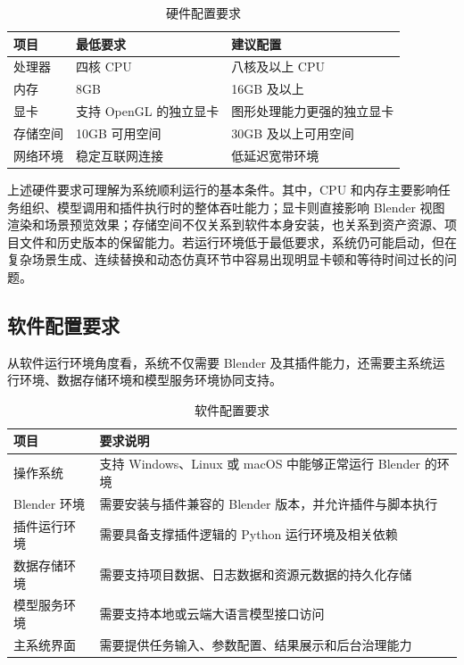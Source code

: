 \documentclass[UTF8,a4paper,10pt]{ctexart}
\begin{document}
\begin{table}[H]
\centering
\caption{硬件配置要求}
\begin{tabularx}{\textwidth}{p{3.0cm} Y Y}
\toprule
项目 & 最低要求 & 建议配置 \\
\midrule
处理器 & 四核 CPU & 八核及以上 CPU \\
内存 & 8GB & 16GB 及以上 \\
显卡 & 支持 OpenGL 的独立显卡 & 图形处理能力更强的独立显卡 \\
存储空间 & 10GB 可用空间 & 30GB 及以上可用空间 \\
网络环境 & 稳定互联网连接 & 低延迟宽带环境 \\
\bottomrule
\end{tabularx}
\end{table}

上述硬件要求可理解为系统顺利运行的基本条件。其中，CPU 和内存主要影响任务组织、模型调用和插件执行时的整体吞吐能力；显卡则直接影响 Blender 视图渲染和场景预览效果；存储空间不仅关系到软件本身安装，也关系到资产资源、项目文件和历史版本的保留能力。若运行环境低于最低要求，系统仍可能启动，但在复杂场景生成、连续替换和动态仿真环节中容易出现明显卡顿和等待时间过长的问题。

\subsection{软件配置要求}
从软件运行环境角度看，系统不仅需要 Blender 及其插件能力，还需要主系统运行环境、数据存储环境和模型服务环境协同支持。

\begin{table}[H]
\centering
\caption{软件配置要求}
\begin{tabularx}{\textwidth}{p{3.0cm} Y}
\toprule
项目 & 要求说明 \\
\midrule
操作系统 & 支持 Windows、Linux 或 macOS 中能够正常运行 Blender 的环境 \\
Blender 环境 & 需要安装与插件兼容的 Blender 版本，并允许插件与脚本执行 \\
插件运行环境 & 需要具备支撑插件逻辑的 Python 运行环境及相关依赖 \\
数据存储环境 & 需要支持项目数据、日志数据和资源元数据的持久化存储 \\
模型服务环境 & 需要支持本地或云端大语言模型接口访问 \\
主系统界面 & 需要提供任务输入、参数配置、结果展示和后台治理能力 \\
\bottomrule
\end{tabularx}
\end{table}
\end{document}

